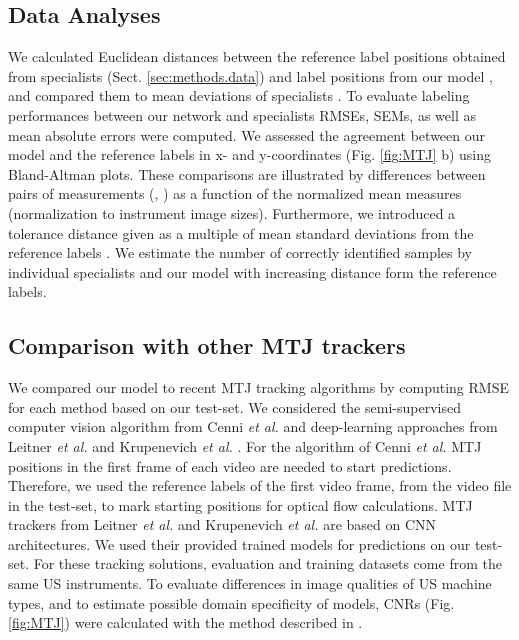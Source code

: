 \documentclass[journal,twoside,web]{ieeecolor}
\begin{document}
\vspace{0.1cm}
\subsection{Data Analyses}
\label{sec:data_analysis}
We calculated Euclidean distances  between the reference label positions  obtained from specialists (Sect. \ref{sec:methods.data}) and label positions from our model , and compared them to mean deviations of specialists . To evaluate labeling performances between our network and specialists RMSEs, SEMs, as well as mean absolute errors were computed. We assessed the agreement between our model and the reference labels in x- and y-coordinates (Fig. \ref{fig:MTJ} b) using Bland-Altman plots. These comparisons are illustrated by differences between pairs of measurements (, ) as a function of the normalized mean measures (normalization to instrument image sizes). Furthermore, we introduced a tolerance distance given as a multiple  of mean standard deviations  from the reference labels . We estimate the number of correctly identified samples by individual specialists and our model with increasing distance form the reference labels.

\vspace{0.1cm}
\subsection*{Comparison with other MTJ trackers}
We compared our model to recent MTJ tracking algorithms by computing RMSE for each method based on our test-set. We considered the semi-supervised computer vision algorithm from Cenni \textit{et al.} \cite{j:Cenni2019} and deep-learning approaches from Leitner \textit{et al.} \cite{c:LeitnerJarolim2020} and Krupenevich \textit{et al.} \cite{j:Krupenevich2021}. For the algorithm of Cenni \textit{et al.} MTJ positions in the first frame of each video are needed to start predictions. Therefore, we used the reference labels  of the first video frame, from the  video file in the test-set, to mark starting positions for optical flow calculations. MTJ trackers from Leitner \textit{et al.} \cite{c:LeitnerJarolim2020} and Krupenevich \textit{et al.} \cite{j:Krupenevich2021} are based on CNN architectures. We used their provided trained models for predictions on our test-set. For these tracking solutions, evaluation and training datasets come from the same US instruments. To evaluate differences in image qualities of US machine types, and to estimate possible domain specificity of models, CNRs (Fig. \ref{fig:MTJ}) were calculated with the method described in \cite{c:Leitner2021}.
\end{document}
